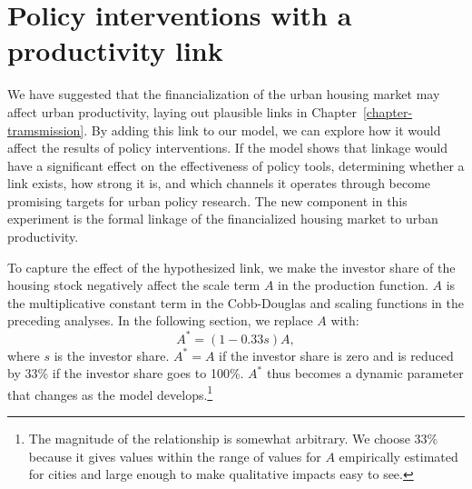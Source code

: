 \section{Policy interventions with a productivity link}

We have suggested that the financialization of the urban housing market may affect urban productivity, laying out plausible links in Chapter~\ref{chapter-tramsmission}. %
By adding this link to our model, we can explore how it would affect the results of policy interventions. If the model shows that linkage would have a significant effect on the effectiveness of policy tools, determining whether a link exists, how strong it is, %
and which channels it operates through become promising targets for urban policy research. 
The new component in this experiment  %
is the formal linkage of the financialized housing market to urban productivity.

To capture the effect of the hypothesized link, we %
make the investor share of the housing stock negatively affect the scale term $A$ in the production function. $A$ is the multiplicative constant term in the Cobb-Douglas and scaling functions in the preceding analyses. In the following section, we replace $A$ with:   
\[A^*= (1-0.33s)A,\]
where $s$ is the investor share. $A^*= A$ if the investor share is zero and is reduced by 33\% if the investor share goes to 100\%. $A^*$ thus becomes a dynamic parameter that changes as the model develops.\footnote{The magnitude of the relationship is somewhat arbitrary. %
We choose 33\% because it gives values within the range of values for $A$ empirically estimated for cities and large enough to make qualitative impacts easy to see. %
} 



